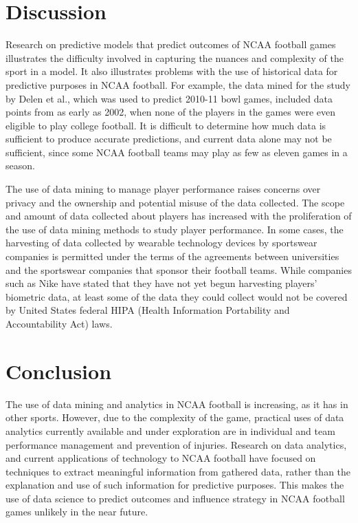\documentclass[sigconf]{acmart}
\begin{document}
\section{Discussion}
	Research on predictive models that predict outcomes of NCAA football games illustrates the difficulty involved in capturing the nuances and complexity of the sport in a model. It also illustrates problems with the use of historical data for predictive purposes in NCAA football. For example, the data mined for the study by Delen et al., which was used to predict 2010-11 bowl games, included data points from as early as 2002, when none of the players in the games were even eligible to play college football. It is difficult to determine how much data is sufficient to produce accurate predictions, and current data alone may not be sufficient, since some NCAA football teams may play as few as eleven games in a season.
	
The use of data mining to manage player performance raises concerns over privacy and the ownership and potential misuse of the data collected\cite{Taylor2017}. The scope and amount of data collected about players has increased with the proliferation of the use of data mining methods to study player performance. In some cases, the harvesting of data collected by wearable technology devices by sportswear companies is permitted under the terms of the agreements between universities and the sportswear companies that sponsor their football teams. While companies such as Nike have stated that they have not yet begun harvesting players' biometric data, at least some of the data they could collect would not be covered by United States federal HIPA (Health Information Portability and Accountability Act) laws\cite{Tracy2016}.


\section{Conclusion}
The use of data mining and analytics in NCAA football is increasing, as it has in other sports. However, due to the complexity of the game, practical uses of data analytics currently available and under exploration are in individual and team performance management and prevention of injuries. Research on data analytics, and current applications of technology to NCAA football have focused on techniques to extract meaningful information from gathered data, rather than the explanation and use of such information for predictive purposes. This makes the use of data science to predict outcomes and influence strategy in NCAA football games unlikely in the near future.


 
\end{document}
